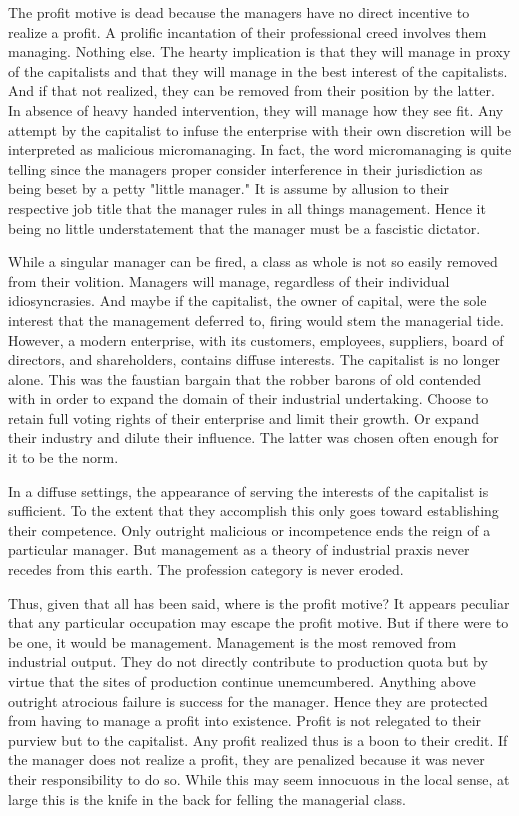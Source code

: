 \documentclass[12pt]{article}
\begin{document}
The profit motive is dead because the managers have no direct incentive to realize a profit.
A prolific incantation of their professional creed involves them managing.
Nothing else.
The hearty implication is that they will manage in proxy of the capitalists and that they will manage in the best interest of the capitalists.
And if that not realized, they can be removed from their position by the latter.
In absence of heavy handed intervention, they will manage how they see fit.
Any attempt by the capitalist to infuse the enterprise with their own discretion will be interpreted as malicious micromanaging.
In fact, the word micromanaging is quite telling since the managers proper consider interference in their jurisdiction as being beset by a petty "little manager."
It is assume by allusion to their respective job title that the manager rules in all things management.
Hence it being no little understatement that the manager must be a fascistic dictator.

While a singular manager can be fired, a class as whole is not so easily removed from their volition.
Managers will manage, regardless of their individual idiosyncrasies.
And maybe if the capitalist, the owner of capital, were the sole interest that the management deferred to, firing would stem the managerial tide.
However, a modern enterprise, with its customers, employees, suppliers, board of directors, and shareholders, contains diffuse interests.
The capitalist is no longer alone.
This was the faustian bargain that the robber barons of old contended with in order to expand the domain of their industrial undertaking.
Choose to retain full voting rights of their enterprise and limit their growth.
Or expand their industry and dilute their influence.
The latter was chosen often enough for it to be the norm.

In a diffuse settings, the appearance of serving the interests of the capitalist is sufficient.
To the extent that they accomplish this only goes toward establishing their competence.
Only outright malicious or incompetence ends the reign of a particular manager.
But management as a theory of industrial praxis never recedes from this earth.
The profession category is never eroded.

Thus, given that all has been said, where is the profit motive?
It appears peculiar that any particular occupation may escape the profit motive.
But if there were to be one, it would be management.
Management is the most removed from industrial output.
They do not directly contribute to production quota but by virtue that the sites of production continue unemcumbered.
Anything above outright atrocious failure is success for the manager.
Hence they are protected from having to manage a profit into existence.
Profit is not relegated to their purview but to the capitalist.
Any profit realized thus is a boon to their credit.
If the manager does not realize a profit, they are penalized because it was never their responsibility to do so.
While this may seem innocuous in the local sense, at large this is the knife in the back for felling the managerial class.
\end{document}
